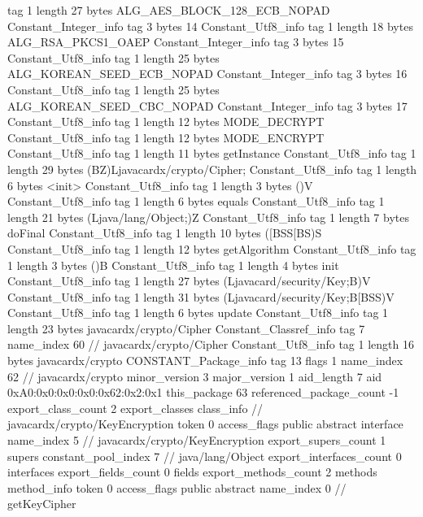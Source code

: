 {{{			tag	1
			length	27
			bytes	ALG_AES_BLOCK_128_ECB_NOPAD
		}
		Constant_Integer_info {
			tag	3
			bytes	14
		}
		Constant_Utf8_info {
			tag	1
			length	18
			bytes	ALG_RSA_PKCS1_OAEP
		}
		Constant_Integer_info {
			tag	3
			bytes	15
		}
		Constant_Utf8_info {
			tag	1
			length	25
			bytes	ALG_KOREAN_SEED_ECB_NOPAD
		}
		Constant_Integer_info {
			tag	3
			bytes	16
		}
		Constant_Utf8_info {
			tag	1
			length	25
			bytes	ALG_KOREAN_SEED_CBC_NOPAD
		}
		Constant_Integer_info {
			tag	3
			bytes	17
		}
		Constant_Utf8_info {
			tag	1
			length	12
			bytes	MODE_DECRYPT
		}
		Constant_Utf8_info {
			tag	1
			length	12
			bytes	MODE_ENCRYPT
		}
		Constant_Utf8_info {
			tag	1
			length	11
			bytes	getInstance
		}
		Constant_Utf8_info {
			tag	1
			length	29
			bytes	(BZ)Ljavacardx/crypto/Cipher;
		}
		Constant_Utf8_info {
			tag	1
			length	6
			bytes	<init>
		}
		Constant_Utf8_info {
			tag	1
			length	3
			bytes	()V
		}
		Constant_Utf8_info {
			tag	1
			length	6
			bytes	equals
		}
		Constant_Utf8_info {
			tag	1
			length	21
			bytes	(Ljava/lang/Object;)Z
		}
		Constant_Utf8_info {
			tag	1
			length	7
			bytes	doFinal
		}
		Constant_Utf8_info {
			tag	1
			length	10
			bytes	([BSS[BS)S
		}
		Constant_Utf8_info {
			tag	1
			length	12
			bytes	getAlgorithm
		}
		Constant_Utf8_info {
			tag	1
			length	3
			bytes	()B
		}
		Constant_Utf8_info {
			tag	1
			length	4
			bytes	init
		}
		Constant_Utf8_info {
			tag	1
			length	27
			bytes	(Ljavacard/security/Key;B)V
		}
		Constant_Utf8_info {
			tag	1
			length	31
			bytes	(Ljavacard/security/Key;B[BSS)V
		}
		Constant_Utf8_info {
			tag	1
			length	6
			bytes	update
		}
		Constant_Utf8_info {
			tag	1
			length	23
			bytes	javacardx/crypto/Cipher
		}
		Constant_Classref_info {
			tag	7
			name_index	60		// javacardx/crypto/Cipher
		}
		Constant_Utf8_info {
			tag	1
			length	16
			bytes	javacardx/crypto
		}
		CONSTANT_Package_info {
			tag	13
			flags	1
			name_index	62		// javacardx/crypto
			minor_version	3
			major_version	1
			aid_length	7
			aid	0xA0:0x0:0x0:0x0:0x62:0x2:0x1
		}
	}
	this_package	63
	referenced_package_count	-1
	export_class_count	2
	export_classes {
		class_info {		// javacardx/crypto/KeyEncryption
			token	0
			access_flags	public abstract interface
			name_index	5		// javacardx/crypto/KeyEncryption
			export_supers_count	1
			supers {
				constant_pool_index	7		// java/lang/Object
			}
			export_interfaces_count	0
			interfaces {
			}
			export_fields_count	0
			fields {
			}
			export_methods_count	2
			methods {
				method_info {
					token	0
					access_flags	public abstract
					name_index	0		// getKeyCipher
}}}}}
